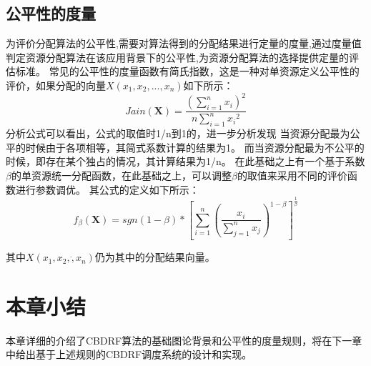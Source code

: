 \subsection{公平性的度量}
为评价分配算法的公平性,需要对算法得到的分配结果进行定量的度量\cite{ref34}\cite{ref35},通过度量值判定资源分配算法在该应用背景下的公平性,为资源分配算法的选择提供定量的评估标准。
常见的公平性的度量函数有简氏指数，这是一种对单资源定义公平性的评价，如果分配的向量$X({x}_{1},{x}_{2},...,{x}_{n})$如下所示：
\begin{equation}
Jain(\textbf{X}) = \frac{{(\sum_{i=1}^{n}{x}_{i})}^{2}}{n\sum_{i=1}^{n}{{x}_{i}}^{2}}
\end{equation}
分析公式可以看出，公式的取值时1/n到1的，进一步分析发现
当资源分配最为公平的时候由于各项相等，其简式系数计算的结果为1。
而当资源分配最为不公平的时候，即存在某个独占的情况，其计算结果为1/n。
在此基础之上有一个基于系数$\beta$的单资源统一分配函数，在此基础之上，可以调整$\beta$的取值来采用不同的评价函数进行参数调优。
其公式的定义如下所示：
\begin{equation}
{f}_{\beta} (\textbf{X})= sgn(1-\beta)*{\left[\sum_{i=1}^{n}{\left(\frac{{x}_{i}}{\sum_{j=1}^{n}{x}_{j}} \right)}^{1 - \beta} \right]}^{\frac{1}{\beta}}
\end{equation}

其中$X({x}_{1},{x}_{2},\dot,{x}_{n})$仍为其中的分配结果向量。


\section{本章小结}
 本章详细的介绍了CBDRF算法的基础图论背景和公平性的度量规则，将在下一章中给出基于上述规则的CBDRF调度系统的设计和实现。
